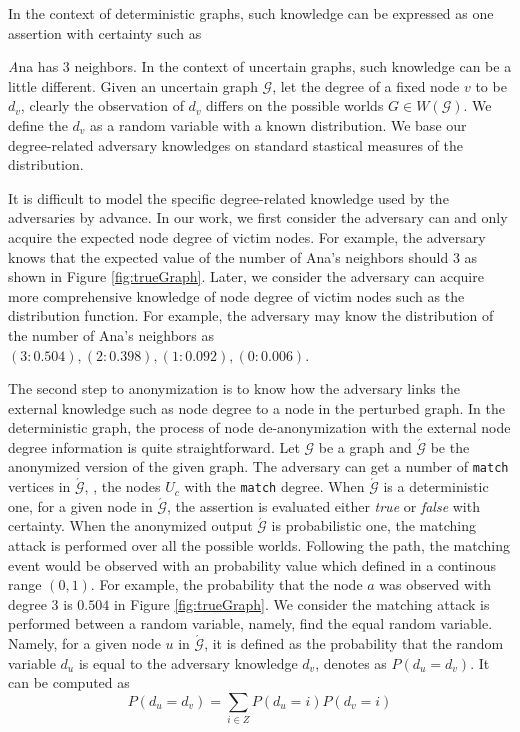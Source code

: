 In the context of deterministic graphs, such knowledge can be expressed as one assertion with certainty such as {\emph Ana has 3 neighbors. In the context of uncertain graphs, such knowledge can be a little different. Given an uncertain graph $\mathcal{G}$, let the degree of a fixed node $v$ to be $d_{v}$, clearly the observation of $d_{v}$ differs on the possible worlds $G \in W(\mathcal{G})$. We define the $d_{v}$ as a random variable with a known distribution. We base our degree-related adversary knowledges on standard stastical measures of the distribution. 

It is difficult to model the specific degree-related knowledge used by the adversaries by advance. In our work, we first consider the adversary can and only acquire the expected node degree of victim nodes. For example, the adversary knows that the expected value of the number of Ana's neighbors should $3$  as shown in Figure \ref{fig:trueGraph}.  Later, we consider the adversary can acquire more comprehensive knowledge of node degree of victim nodes such as the distribution function. For example, the adversary may know the distribution of the number of Ana's neighbors as ${(3:0.504),(2:0.398),(1:0.092),(0:0.006)}$. 

The second step to anonymization is to know how the adversary links the external knowledge such as node degree to a node in the perturbed graph. In the deterministic graph, the process of node de-anonymization with the external node degree information is quite straightforward. Let $\mathcal{G}$ be a graph and $\acute{\mathcal{G}}$ be the anonymized version of the given graph. The adversary can get a number of \texttt{match} vertices in $\acute{\mathcal{G}}$, {\ie}, the nodes $U_{c}$ with the \texttt{match} degree. When $\acute{\mathcal{G}}$ is a deterministic one, for a given node in $\acute{\mathcal{G}}$, the assertion is evaluated either \emph{true} or \emph{false} with certainty. When the anonymized output $\acute{\mathcal{G}}$ is probabilistic one, the matching attack is performed over all the possible worlds. Following the path, the matching event would be observed with an probability value which defined in a continous range $(0,1)$. For example, the probability that the node $a$ was observed with degree $3$ is $0.504$ in Figure \ref{fig:trueGraph}. We consider the matching attack is performed between a random variable, namely, find the equal random variable. Namely, for a given node $u$ in $\acute{\mathcal{G}}$, it is defined as the probability that the random variable $d_{u}$ is equal to the adversary knowledge $d_{v}$, denotes as $P(d_{u}=d_{v})$. It can be computed as 
\begin{equation*}
    P(d_{u}=d_{v})= \sum_{i \in Z } P(d_{u}=i) P(d_{v}=i) 
\end{equation*}

}
